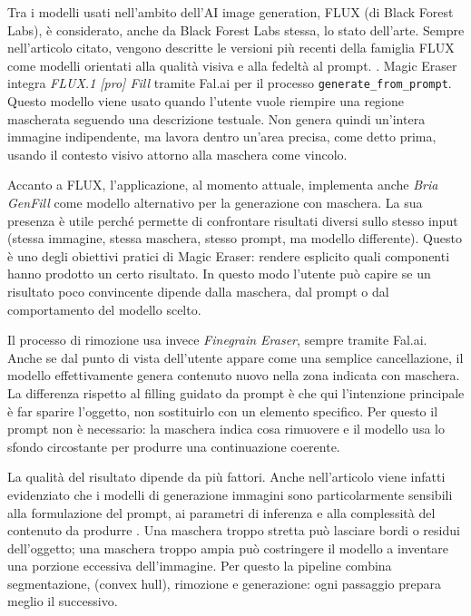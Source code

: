 \documentclass[oneside]{supsistudent}
\begin{document}
\vspace{\baselineskip}
Tra i modelli usati nell'ambito dell'AI image generation, FLUX (di Black Forest Labs),
è considerato, anche da Black Forest Labs stessa, lo stato dell'arte.
Sempre nell'articolo citato, vengono descritte
le versioni più recenti della famiglia FLUX come modelli orientati alla
qualità visiva e alla fedeltà al prompt. \cite{bentoml-generative-models}.
Magic Eraser integra
\textit{FLUX.1 [pro] Fill} tramite Fal.ai per il processo
\texttt{generate\_from\_prompt}. Questo modello viene usato quando
l'utente vuole riempire una regione mascherata seguendo una
descrizione testuale. Non genera quindi un'intera immagine indipendente, ma
lavora dentro un'area precisa, come detto prima, usando il contesto visivo
attorno alla maschera come vincolo.

\vspace{\baselineskip}

Accanto a FLUX, l'applicazione, al momento attuale, implementa anche \textit{Bria GenFill} come
modello alternativo per la generazione con maschera. La sua
presenza è utile perché permette di confrontare risultati diversi sullo stesso
input (stessa immagine, stessa maschera, stesso prompt, ma
modello differente). Questo è uno degli obiettivi pratici di Magic Eraser:
rendere esplicito quali componenti hanno prodotto un certo risultato.
In questo modo l'utente può capire se un risultato poco convincente dipende
dalla maschera, dal prompt o dal comportamento del modello scelto.

\vspace{\baselineskip}

Il processo di rimozione usa invece \textit{Finegrain Eraser}, sempre tramite Fal.ai.
Anche se dal punto di vista dell'utente appare come
una semplice cancellazione, il modello effettivamente genera contenuto nuovo
nella zona indicata con maschera. La differenza rispetto al filling
guidato da prompt è che qui l'intenzione principale è far sparire l'oggetto,
non sostituirlo con un elemento specifico. Per questo il
prompt non è necessario: la maschera indica cosa rimuovere e il modello
usa lo sfondo circostante per produrre una continuazione
coerente.

\vspace{\baselineskip}


La qualità del risultato dipende da più fattori. Anche nell'articolo viene infatti
evidenziato che i modelli di generazione immagini sono particolarmente sensibili
alla formulazione del prompt, ai parametri di inferenza e alla complessità
del contenuto da produrre \cite{bentoml-generative-models}.
Una maschera troppo stretta può lasciare bordi o residui
dell'oggetto; una maschera troppo ampia può costringere il modello a inventare
una porzione eccessiva dell'immagine. Per questo la
pipeline combina segmentazione, (convex hull), rimozione e generazione: ogni
passaggio prepara meglio il successivo.
\end{document}
